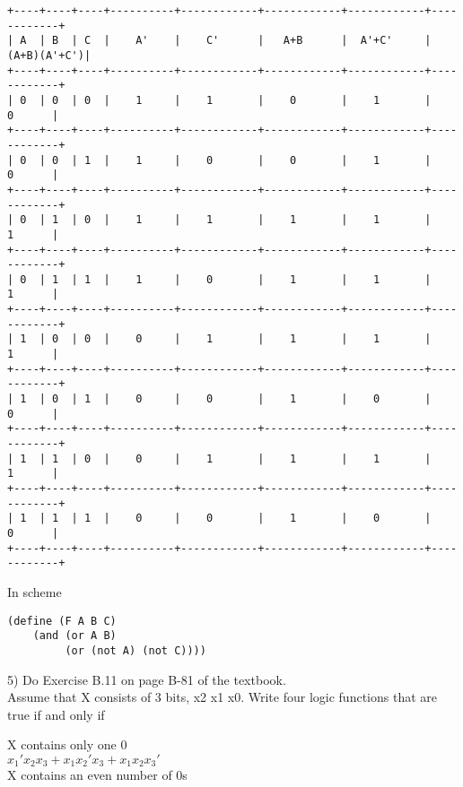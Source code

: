 \begin{verbatim}
+----+----+----+----------+------------+------------+------------+------------+
| A  | B  | C  |    A'    |    C'      |   A+B      |  A'+C'     |(A+B)(A'+C')|
+----+----+----+----------+------------+------------+------------+------------+
| 0  | 0  | 0  |    1     |    1       |    0       |    1       |     0      |
+----+----+----+----------+------------+------------+------------+------------+
| 0  | 0  | 1  |    1     |    0       |    0       |    1       |     0      |
+----+----+----+----------+------------+------------+------------+------------+
| 0  | 1  | 0  |    1     |    1       |    1       |    1       |     1      |
+----+----+----+----------+------------+------------+------------+------------+
| 0  | 1  | 1  |    1     |    0       |    1       |    1       |     1      |
+----+----+----+----------+------------+------------+------------+------------+
| 1  | 0  | 0  |    0     |    1       |    1       |    1       |     1      |
+----+----+----+----------+------------+------------+------------+------------+
| 1  | 0  | 1  |    0     |    0       |    1       |    0       |     0      |
+----+----+----+----------+------------+------------+------------+------------+
| 1  | 1  | 0  |    0     |    1       |    1       |    1       |     1      |
+----+----+----+----------+------------+------------+------------+------------+
| 1  | 1  | 1  |    0     |    0       |    1       |    0       |     0      |
+----+----+----+----------+------------+------------+------------+------------+
\end{verbatim}

In scheme 
\begin{verbatim}
(define (F A B C) 
    (and (or A B) 
         (or (not A) (not C)))) 
\end{verbatim}

\vspace{5cm}


5) Do Exercise B.11 on page B-81 of the textbook. \\

Assume that X consists of 3 bits, x2 x1 x0. Write four logic functions that are true if and only if

X contains only one 0 \\

$x_1'x_2x_3 + x_1x_2'x_3 + x_1x_2x_3'$ \\

X contains an even number of 0s \\

